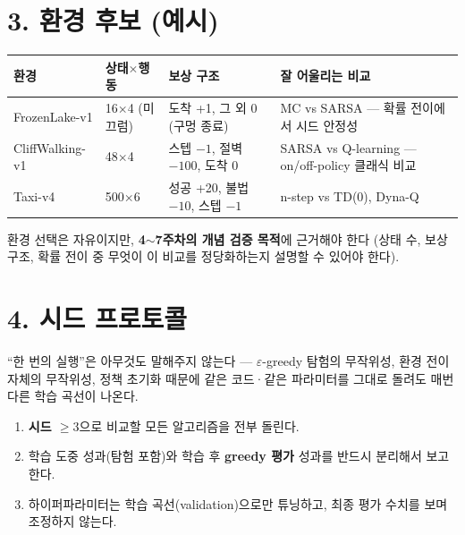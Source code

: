 \documentclass[12pt]{article}
\begin{document}
\section*{3. 환경 후보 (예시)}
\begin{center}
\small
\begin{tabular}{@{}lllp{4.4cm}@{}}
\toprule
환경 & 상태$\times$행동 & 보상 구조 & 잘 어울리는 비교 \\
\midrule
FrozenLake-v1 & 16$\times$4 (미끄럼) & 도착 +1, 그 외 0 (구멍 종료)
& MC vs SARSA --- 확률 전이에서 시드 안정성 \\
CliffWalking-v1 & 48$\times$4 & 스텝 $-1$, 절벽 $-100$, 도착 0 &
SARSA vs Q-learning --- on/off-policy 클래식 비교 \\
Taxi-v4 & 500$\times$6 & 성공 +20, 불법 $-10$, 스텝 $-1$ &
n-step vs TD(0), Dyna-Q \\
\bottomrule
\end{tabular}
\end{center}
\vspace{4pt}
환경 선택은 자유이지만, \textbf{4$\sim$7주차의 개념 검증
목적}에 근거해야 한다 (상태 수, 보상 구조, 확률 전이 중 무엇이 이
비교를 정당화하는지 설명할 수 있어야 한다).

\section*{4. 시드 프로토콜}
``한 번의 실행''은 아무것도 말해주지 않는다 --- $\varepsilon$-greedy
탐험의 무작위성, 환경 전이 자체의 무작위성, 정책 초기화 때문에
같은 코드·같은 파라미터를 그대로 돌려도 매번 다른 학습 곡선이
나온다.
\begin{enumerate}
\item \textbf{시드 $\ge 3$}으로 비교할 모든 알고리즘을 전부
  돌린다.
\item 학습 도중 성과(탐험 포함)와 학습 후 \textbf{greedy 평가}
  성과를 반드시 분리해서 보고한다.
\item 하이퍼파라미터는 학습 곡선(validation)으로만 튜닝하고,
  최종 평가 수치를 보며 조정하지 않는다.
\end{enumerate}

\newpage
\end{document}
